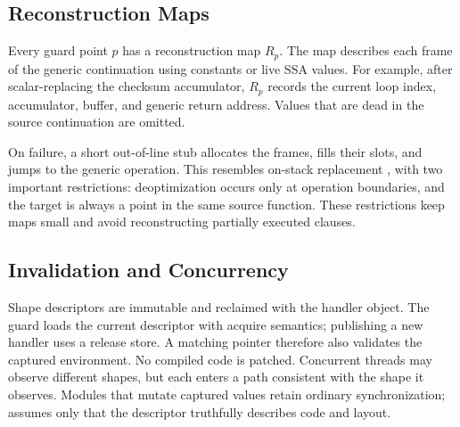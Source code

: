 \subsection{Reconstruction Maps}
\label{sec:reconstruction}

Every guard point $p$ has a reconstruction map $R_p$. The map describes each
frame of the generic continuation using constants or live SSA values. For
example, after scalar-replacing the checksum accumulator, $R_p$ records the
current loop index, accumulator, buffer, and generic return address. Values
that are dead in the source continuation are omitted.

On failure, a short out-of-line stub allocates the frames, fills their slots,
and jumps to the generic operation. This resembles on-stack replacement
\cite{delia2018osr}, with two important restrictions: deoptimization occurs
only at operation boundaries, and the target is always a point in the same
source function. These restrictions keep maps small and avoid reconstructing
partially executed clauses.

\subsection{Invalidation and Concurrency}

Shape descriptors are immutable and reclaimed with the handler object. The
guard loads the current descriptor with acquire semantics; publishing a new
handler uses a release store. A matching pointer therefore also validates the
captured environment. No compiled code is patched. Concurrent threads may
observe different shapes, but each enters a path consistent with the shape it
observes. Modules that mutate captured values retain ordinary synchronization;
\system assumes only that the descriptor truthfully describes code and layout.
